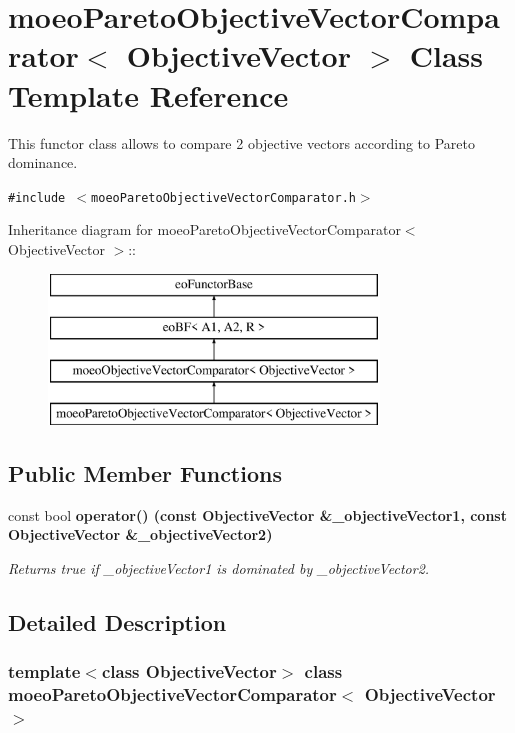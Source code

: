 \section{moeo\-Pareto\-Objective\-Vector\-Comparator$<$ Objective\-Vector $>$ Class Template Reference}
\label{classmoeoParetoObjectiveVectorComparator}
This functor class allows to compare 2 objective vectors according to Pareto dominance.  


{\tt \#include $<$moeo\-Pareto\-Objective\-Vector\-Comparator.h$>$}

Inheritance diagram for moeo\-Pareto\-Objective\-Vector\-Comparator$<$ Objective\-Vector $>$::\begin{figure}[H]
\begin{center}
\leavevmode
\includegraphics[height=4cm]{classmoeoParetoObjectiveVectorComparator}
\end{center}
\end{figure}
\subsection*{Public Member Functions}
\begin{CompactItemize}
\item 
const bool \bf{operator()} (const Objective\-Vector \&\_\-objective\-Vector1, const Objective\-Vector \&\_\-objective\-Vector2)
\begin{CompactList}\small\item\em Returns true if \_\-objective\-Vector1 is dominated by \_\-objective\-Vector2. \item\end{CompactList}\end{CompactItemize}


\subsection{Detailed Description}
\subsubsection*{template$<$class Objective\-Vector$>$ class moeo\-Pareto\-Objective\-Vector\-Comparator$<$ Objective\-Vector $>$}

